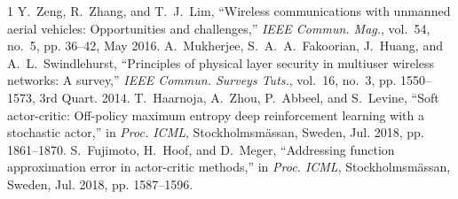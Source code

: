 \documentclass[journal,onecolumn]{IEEEtran}
\begin{document}


\begin{thebibliography}{1}
Y.~Zeng, R.~Zhang, and T.~J.~Lim, ``Wireless communications with unmanned aerial vehicles: Opportunities and challenges,'' \emph{IEEE Commun. Mag.}, vol.~54, no.~5, pp. 36--42, May 2016.
A.~Mukherjee, S.~A.~A.~Fakoorian, J.~Huang, and A.~L.~Swindlehurst, ``Principles of physical layer security in multiuser wireless networks: A survey,'' \emph{IEEE Commun. Surveys Tuts.}, vol.~16, no.~3, pp. 1550--1573, 3rd Quart. 2014.
T.~Haarnoja, A.~Zhou, P.~Abbeel, and S.~Levine, ``Soft actor-critic: Off-policy maximum entropy deep reinforcement learning with a stochastic actor,'' in \emph{Proc. ICML}, Stockholmsmässan, Sweden, Jul. 2018, pp. 1861--1870.
S.~Fujimoto, H.~Hoof, and D.~Meger, ``Addressing function approximation error in actor-critic methods,'' in \emph{Proc. ICML}, Stockholmsmässan, Sweden, Jul. 2018, pp. 1587--1596.
\end{thebibliography}
\end{document}
